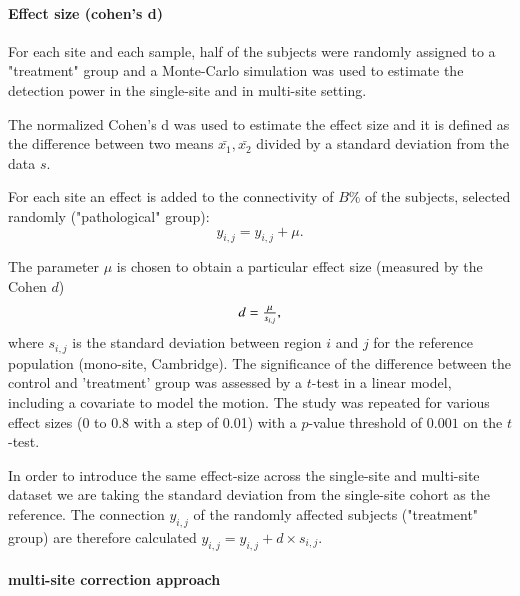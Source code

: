 \documentclass[authoryear]{elsarticle}
\begin{document}
\paragraph{Effect size (cohen's d)}
For each site and each sample, half of the subjects were randomly assigned to a "treatment" group and a Monte-Carlo simulation was used to estimate the detection power in the single-site and in multi-site setting.

The normalized Cohen's d was used to estimate the effect size and it is defined as the difference between two means $\bar{x_{1}},\bar{x_{2}}$ divided by a standard deviation from the data $s$.

For each site an effect is added to the connectivity of $B\%$ of the subjects, selected randomly ("pathological" group):
\begin{equation}
	y_{i,j} = y_{i,j} + \mu.
\end{equation}

The parameter $\mu$ is chosen to obtain a particular effect size (measured by the Cohen $d$)
\begin{equation}\label{cohen's d}
    \begin{array}{l l}
      d = \frac{\mu}{s_{i,j}},      
    \end{array}
\end{equation}
where $s_{i,j}$ is the standard deviation between region $i$ and $j$ for the reference population (mono-site, Cambridge). The significance of the difference between the control and 'treatment' group was assessed by a $t$-test in a linear model, including a covariate to model the motion. The study was repeated for various effect sizes (0 to 0.8 with a step of 0.01) with a $p$-value threshold of $0.001$ on the $t$-test.

In order to introduce the same effect-size across the single-site and multi-site dataset we are taking the standard deviation from the single-site cohort as the reference.  The connection $y_{i,j}$ of the randomly affected subjects ("treatment" group) are therefore calculated $y_{i,j} = y_{i,j} + d\times s_{i,j}$. 

\paragraph{multi-site correction approach} 
\end{document}
